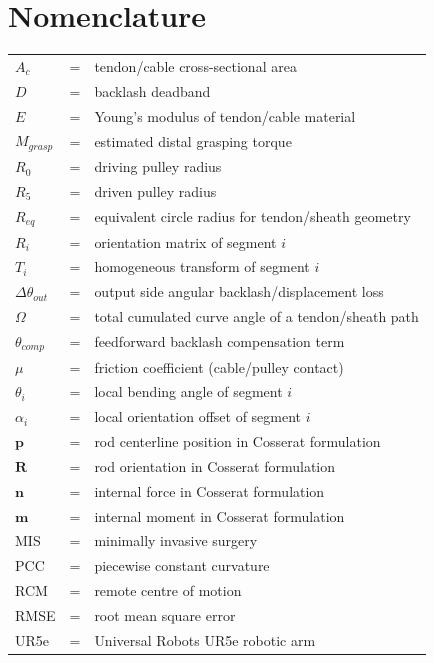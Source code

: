 \documentclass[12pt]{article}
\begin{document}
\newpage
\tableofcontents
\newpage
\listoffigures
{}
\listoftables
{}

\newpage
\section*{Nomenclature}

\vspace{0.5cm}
\begin{tabular}{>{\raggedright}p{2cm} c p{10cm}}
$A_c$ & = & tendon/cable cross-sectional area \\
$D$ & = & backlash deadband \\
$E$ & = & Young's modulus of tendon/cable material \\
$M_{grasp}$ & = & estimated distal grasping torque \\
$R_0$ & = & driving pulley radius \\
$R_5$ & = & driven pulley radius \\
$R_{eq}$ & = & equivalent circle radius for tendon/sheath geometry \\
$R_i$ & = & orientation matrix of segment $i$ \\
$T_i$ & = & homogeneous transform of segment $i$ \\
$\Delta\theta_{out}$ & = & output side angular backlash/displacement loss \\
$\Omega$ & = & total cumulated curve angle of a tendon/sheath path \\
$\theta_{comp}$ & = & feedforward backlash compensation term \\
$\mu$ & = & friction coefficient (cable/pulley contact) \\
$\theta_i$ & = & local bending angle of segment $i$ \\
$\alpha_i$ & = & local orientation offset of segment $i$ \\
$\boldsymbol{p}$ & = & rod centerline position in Cosserat formulation \\
$\boldsymbol{R}$ & = & rod orientation in Cosserat formulation \\
$\boldsymbol{n}$ & = & internal force in Cosserat formulation \\
$\boldsymbol{m}$ & = & internal moment in Cosserat formulation \\
MIS & = & minimally invasive surgery \\
PCC & = & piecewise constant curvature \\
RCM & = & remote centre of motion \\
RMSE & = & root mean square error \\
UR5e & = & Universal Robots UR5e robotic arm \\
\end{tabular}
\end{document}
